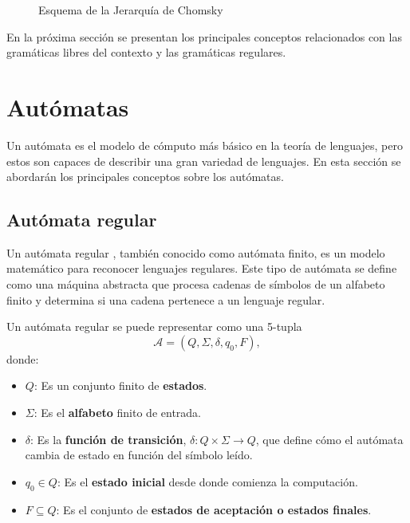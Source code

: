 \documentclass[12pt]{article}
\begin{document}
\begin{figure}
      \centering
      \caption{Esquema de la Jerarquía de Chomsky}
      \label{fig:ChomskySchema} %
\end{figure}

En la próxima sección se presentan los principales conceptos relacionados con las gramáticas libres del contexto y las 
gramáticas regulares.

\section{Autómatas}
Un autómata es el modelo de cómputo más básico en la teoría de lenguajes, pero estos son capaces de describir
una gran variedad de lenguajes. En esta sección se abordarán los principales conceptos sobre los autómatas.
\subsection{Autómata regular}

Un autómata regular \cite{authomataTheory}, también conocido como autómata finito, es un modelo matemático para reconocer lenguajes regulares. Este tipo de autómata se define como una máquina abstracta que procesa cadenas de símbolos de un alfabeto finito y determina si una cadena pertenece a un lenguaje regular.

Un autómata regular se puede representar como una 5-tupla $$\mathcal{A} = (Q, \Sigma, \delta, q_0, F),$$ donde:

\begin{itemize}
      \item $Q$: Es un conjunto finito de \textbf{estados}.
      \item $\Sigma$: Es el \textbf{alfabeto} finito de entrada.
      \item $\delta$: Es la \textbf{función de transición}, $\delta: Q \times \Sigma \to Q$, que define cómo el autómata cambia de estado en función del símbolo leído.
      \item $q_0 \in Q$: Es el \textbf{estado inicial} desde donde comienza la computación.
      \item $F \subseteq Q$: Es el conjunto de \textbf{estados de aceptación o estados finales}.
\end{itemize}
\end{document}
